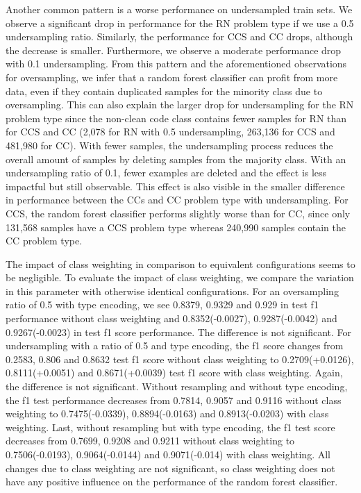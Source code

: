 Another common pattern is a worse performance on undersampled train sets. We observe a significant drop in performance for the RN problem type if we use a 0.5 undersampling ratio. Similarly, the performance for CCS and CC drops, although the decrease is smaller. Furthermore, we observe a moderate performance drop with 0.1 undersampling. From this pattern and the aforementioned observations for oversampling, we infer that a random forest classifier can profit from more data, even if they contain duplicated samples for the minority class due to oversampling. This can also explain the larger drop for undersampling for the RN problem type since the non-clean code class contains fewer samples for RN than for CCS and CC (2,078 for RN with 0.5 undersampling, 263,136 for CCS and 481,980 for CC). With fewer samples, the undersampling process reduces the overall amount of samples by deleting samples from the majority class. With an undersampling ratio of 0.1, fewer examples are deleted and the effect is less impactful but still observable. This effect is also visible in the smaller difference in performance between the CCs and CC problem type with undersampling. For CCS, the random forest classifier performs slightly worse than for CC, since only 131,568 samples have a CCS problem type whereas 240,990 samples contain the CC problem type.

The impact of class weighting in comparison to equivalent configurations seems to be negligible. 
To evaluate the impact of class weighting, we compare the variation in this parameter with otherwise identical configurations.
For an oversampling ratio of 0.5 with type encoding, we see 0.8379, 0.9329 and 0.929 in test f1 performance without class weighting and 0.8352(-0.0027), 0.9287(-0.0042) and 0.9267(-0.0023) in test f1 score performance. The difference is not significant.
For undersampling with a ratio of 0.5 and type encoding, the f1 score changes from 0.2583, 0.806 and 0.8632 test f1 score without class weighting to 0.2709(+0.0126), 0.8111(+0.0051) and 0.8671(+0.0039) test f1 score with class weighting. Again, the difference is not significant.
Without resampling and without type encoding, the f1 test performance decreases from 0.7814, 0.9057 and 0.9116 without class weighting to 0.7475(-0.0339), 0.8894(-0.0163) and 0.8913(-0.0203) with class weighting.
Last, without resampling but with type encoding, the f1 test score decreases from 0.7699, 0.9208 and 0.9211 without class weighting to 0.7506(-0.0193), 0.9064(-0.0144) and 0.9071(-0.014) with class weighting.
All changes due to class weighting are not significant, so class weighting does not have any positive influence on the performance of the random forest classifier.

